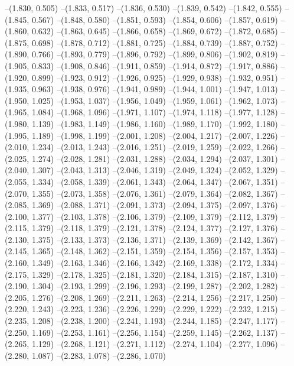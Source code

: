 {--(1.830, 0.505)
--(1.833, 0.517)
--(1.836, 0.530)
--(1.839, 0.542)
--(1.842, 0.555)
--(1.845, 0.567)
--(1.848, 0.580)
--(1.851, 0.593)
--(1.854, 0.606)
--(1.857, 0.619)
--(1.860, 0.632)
--(1.863, 0.645)
--(1.866, 0.658)
--(1.869, 0.672)
--(1.872, 0.685)
--(1.875, 0.698)
--(1.878, 0.712)
--(1.881, 0.725)
--(1.884, 0.739)
--(1.887, 0.752)
--(1.890, 0.766)
--(1.893, 0.779)
--(1.896, 0.792)
--(1.899, 0.806)
--(1.902, 0.819)
--(1.905, 0.833)
--(1.908, 0.846)
--(1.911, 0.859)
--(1.914, 0.872)
--(1.917, 0.886)
--(1.920, 0.899)
--(1.923, 0.912)
--(1.926, 0.925)
--(1.929, 0.938)
--(1.932, 0.951)
--(1.935, 0.963)
--(1.938, 0.976)
--(1.941, 0.989)
--(1.944, 1.001)
--(1.947, 1.013)
--(1.950, 1.025)
--(1.953, 1.037)
--(1.956, 1.049)
--(1.959, 1.061)
--(1.962, 1.073)
--(1.965, 1.084)
--(1.968, 1.096)
--(1.971, 1.107)
--(1.974, 1.118)
--(1.977, 1.128)
--(1.980, 1.139)
--(1.983, 1.149)
--(1.986, 1.160)
--(1.989, 1.170)
--(1.992, 1.180)
--(1.995, 1.189)
--(1.998, 1.199)
--(2.001, 1.208)
--(2.004, 1.217)
--(2.007, 1.226)
--(2.010, 1.234)
--(2.013, 1.243)
--(2.016, 1.251)
--(2.019, 1.259)
--(2.022, 1.266)
--(2.025, 1.274)
--(2.028, 1.281)
--(2.031, 1.288)
--(2.034, 1.294)
--(2.037, 1.301)
--(2.040, 1.307)
--(2.043, 1.313)
--(2.046, 1.319)
--(2.049, 1.324)
--(2.052, 1.329)
--(2.055, 1.334)
--(2.058, 1.339)
--(2.061, 1.343)
--(2.064, 1.347)
--(2.067, 1.351)
--(2.070, 1.355)
--(2.073, 1.358)
--(2.076, 1.361)
--(2.079, 1.364)
--(2.082, 1.367)
--(2.085, 1.369)
--(2.088, 1.371)
--(2.091, 1.373)
--(2.094, 1.375)
--(2.097, 1.376)
--(2.100, 1.377)
--(2.103, 1.378)
--(2.106, 1.379)
--(2.109, 1.379)
--(2.112, 1.379)
--(2.115, 1.379)
--(2.118, 1.379)
--(2.121, 1.378)
--(2.124, 1.377)
--(2.127, 1.376)
--(2.130, 1.375)
--(2.133, 1.373)
--(2.136, 1.371)
--(2.139, 1.369)
--(2.142, 1.367)
--(2.145, 1.365)
--(2.148, 1.362)
--(2.151, 1.359)
--(2.154, 1.356)
--(2.157, 1.353)
--(2.160, 1.349)
--(2.163, 1.346)
--(2.166, 1.342)
--(2.169, 1.338)
--(2.172, 1.334)
--(2.175, 1.329)
--(2.178, 1.325)
--(2.181, 1.320)
--(2.184, 1.315)
--(2.187, 1.310)
--(2.190, 1.304)
--(2.193, 1.299)
--(2.196, 1.293)
--(2.199, 1.287)
--(2.202, 1.282)
--(2.205, 1.276)
--(2.208, 1.269)
--(2.211, 1.263)
--(2.214, 1.256)
--(2.217, 1.250)
--(2.220, 1.243)
--(2.223, 1.236)
--(2.226, 1.229)
--(2.229, 1.222)
--(2.232, 1.215)
--(2.235, 1.208)
--(2.238, 1.200)
--(2.241, 1.193)
--(2.244, 1.185)
--(2.247, 1.177)
--(2.250, 1.169)
--(2.253, 1.161)
--(2.256, 1.154)
--(2.259, 1.145)
--(2.262, 1.137)
--(2.265, 1.129)
--(2.268, 1.121)
--(2.271, 1.112)
--(2.274, 1.104)
--(2.277, 1.096)
--(2.280, 1.087)
--(2.283, 1.078)
--(2.286, 1.070)
}
